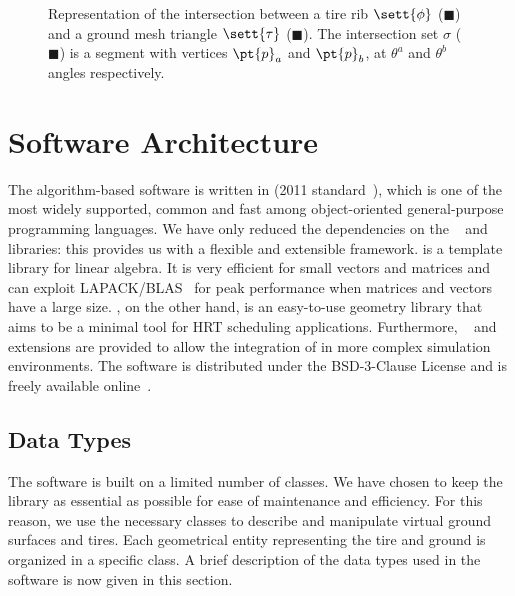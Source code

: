 \begin{figure}[htb]
  \centering
  \def\svgwidth{0.5\textwidth}
  
  \caption{Representation of the intersection between a tire rib $\sett{\phi}$ (\textcolor[RGB]{255, 231, 187}{$\blacksquare$}) and a ground mesh triangle $\sett{\tau}$ (\textcolor[RGB]{255, 218, 217}{$\blacksquare$}). The intersection set $\sigma$ (\textcolor[RGB]{74, 181, 99}{$\blacksquare$}) is a segment with
  vertices $\pt{p}_a$ and $\pt{p}_b$, at $\theta^a$ and $\theta^b$ angles respectively.}
  \label{app2:fig:intersection}
\end{figure}


\section{Software Architecture}
\label{app2:sec:software_architecture}

The \Enve{} algorithm-based software is written in \cpp{} (2011 standard~\cite{stroustrup2013cpp}), which is one of the most widely supported, common and fast among object-oriented general-purpose programming languages. We have only reduced the dependencies on the \Eigen{}~\cite{eigen2010eigen} and \Acme{}~\cite{stocco2021acme} libraries: this provides us with a flexible and extensible framework. \Eigen{} is a template library for linear algebra. It is very efficient for small vectors and matrices and can exploit \ac{LAPACK}/\ac{BLAS}~\cite{anderson1999lapack} for peak performance when matrices and vectors have a large size. \Acme{}, on the other hand, is an easy-to-use geometry library that aims to be a minimal tool for \ac{HRT} scheduling applications. Furthermore, \Matlab{}~\Mex{} and \Simulink{}~\SFunction{} extensions are provided to allow the integration of \Enve{} in more complex simulation environments. The software is distributed under the BSD-3-Clause License and is freely available online~\cite{enve}.

\subsection{Data Types}
\label{app2:sec:data_types}

The software is built on a limited number of classes. We have chosen to keep the library as essential as possible for ease of maintenance and efficiency. For this reason, we use the necessary classes to describe and manipulate virtual ground surfaces and tires. Each geometrical entity representing the tire and ground is organized in a specific class. A brief description of the data types used in the software is now given in this section.

